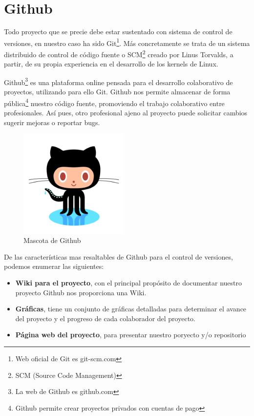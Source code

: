 \section{Github}


Todo proyecto que se precie debe estar sustentado con sistema de control de versiones, en nuestro caso ha sido Git\footnote{Web oficial de Git es git-scm.com}. Más concretamente se trata de un sistema distribuido de control de código fuente o SCM\footnote{SCM (Source Code Management)} creado por Linus Torvalds, a partir, de su propia experiencia en el desarrollo de los kernels de Linux. 

Github\footnote{La web de Github es github.com} es una plataforma online pensada para el desarrollo colaborativo de proyectos, utilizando para ello Git. Github nos permite almacenar de forma pública\footnote{Github permite crear proyectos privados con cuentas de pago} nuestro código fuente, promoviendo el trabajo colaborativo entre profesionales. Así pues, otro profesional ajeno al proyecto puede solicitar cambios sugerir mejoras o reportar bugs.

\begin{figure}
  \begin{center}
    \includegraphics[width=0.48\textwidth]{imagenes/octocat}
  \end{center}
  \caption{Mascota de Github}
	\label{fig:octocat}
\end{figure}

De las características mas resaltables de Github para el control de versiones, podemos enumerar las siguientes:
\begin{itemize}
\item \textbf{Wiki para el proyecto}, con el principal propósito de documentar nuestro proyecto Github nos proporciona una Wiki. 
\item \textbf{Gráficas}, tiene un conjunto de gráficas detalladas para determinar el avance del proyecto y el progreso de cada colaborador del proyecto.
\item \textbf{Página web del proyecto}, para presentar nuestro poryecto y/o repositorio 
\end{itemize}

